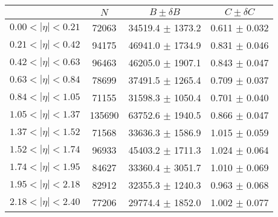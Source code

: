 \begin{tabular}{lccc}
\hline
    &   $N$   & $B \pm \delta B$  &  $C \pm \delta C$ \\
\hline
$0.00 < |\eta| <0.21$          & 72063      & 34519.4    $\pm$ 1373.2 & 0.611      $\pm$ 0.032 \\
$0.21 < |\eta| <0.42$          & 94175      & 46941.0    $\pm$ 1734.9 & 0.831      $\pm$ 0.046 \\
$0.42 < |\eta| <0.63$          & 96463      & 46205.0    $\pm$ 1907.1 & 0.843      $\pm$ 0.047 \\
$0.63 < |\eta| <0.84$          & 78699      & 37491.5    $\pm$ 1265.4 & 0.709      $\pm$ 0.037 \\
$0.84 < |\eta| <1.05$          & 71155      & 31598.3    $\pm$ 1050.4 & 0.701      $\pm$ 0.040 \\
$1.05 < |\eta| <1.37$          & 135690     & 63752.6    $\pm$ 1940.5 & 0.866      $\pm$ 0.047 \\
$1.37 < |\eta| <1.52$          & 71568      & 33636.3    $\pm$ 1586.9 & 1.015      $\pm$ 0.059 \\
$1.52 < |\eta| <1.74$          & 96933      & 45403.2    $\pm$ 1711.3 & 1.024      $\pm$ 0.064 \\
$1.74 < |\eta| <1.95$          & 84627      & 33360.4    $\pm$ 3051.7 & 1.010      $\pm$ 0.069 \\
$1.95 < |\eta| <2.18$          & 82912      & 32355.3    $\pm$ 1240.3 & 0.963      $\pm$ 0.068 \\
$2.18 < |\eta| <2.40$          & 77206      & 29774.4    $\pm$ 1852.0 & 1.002      $\pm$ 0.077 \\
\hline
\end{tabular}
